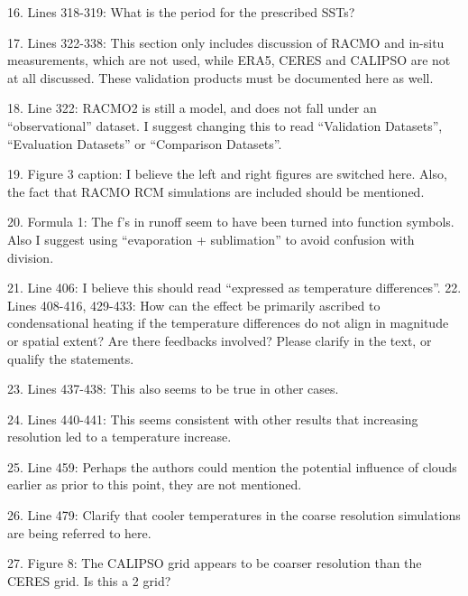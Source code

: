 \documentclass[12pt,oneside,a4paper]{article}%
\begin{document}
16. Lines 318-319: What is the period for the prescribed SSTs? \newline

17. Lines 322-338: This section only includes discussion of RACMO and in-situ measurements, which are not used, while ERA5, CERES and CALIPSO are not at all discussed. These validation products must be documented here as well. \newline

18. Line 322: RACMO2 is still a model, and does not fall under an “observational” dataset. I suggest changing this to read “Validation Datasets”, “Evaluation Datasets” or “Comparison Datasets”. \newline

19. Figure 3 caption: I believe the left and right figures are switched here. Also, the fact that RACMO RCM simulations are included should be mentioned. \newline

20. Formula 1: The f’s in runoff seem to have been turned into function symbols. Also I suggest using “evaporation + sublimation” to avoid confusion with division. \newline

21. Line 406: I believe this should read “expressed as temperature differences”. 22. Lines 408-416, 429-433: How can the effect be primarily ascribed to condensational heating if the temperature differences do not align in magnitude or spatial extent? Are there feedbacks involved? Please clarify in the text, or qualify the statements. \newline

23. Lines 437-438: This also seems to be true in other cases. \newline

24. Lines 440-441: This seems consistent with other results that increasing resolution led to a temperature increase. \newline

25. Line 459: Perhaps the authors could mention the potential influence of clouds earlier as prior to this point, they are not mentioned. \newline

26. Line 479: Clarify that cooler temperatures in the coarse resolution simulations are being referred to here. \newline

27. Figure 8: The CALIPSO grid appears to be coarser resolution than the CERES grid. Is this a 2 grid? \newline
\end{document}
